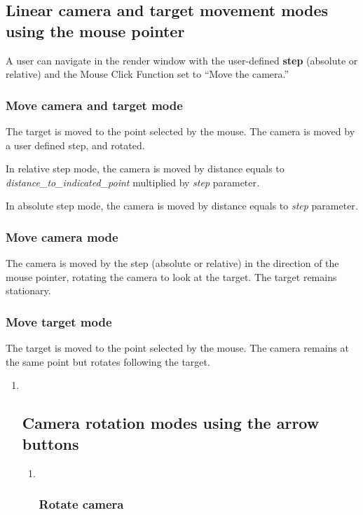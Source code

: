 \subsection{Linear camera and target movement modes using the mouse
pointer}\label{linear-camera-and-target-movement-modes-using-the-mouse-pointer}

A user can navigate in the render window with the user-defined
\textbf{step} (absolute or relative) and the Mouse Click Function set to
``Move the camera.''

\subsubsection{Move camera and target
mode}\label{move-camera-and-target-mode-1}

The target is moved to the point selected by the mouse. The camera is
moved by a user defined step, and rotated.

In relative step mode, the camera is moved by distance equals to
\emph{distance\_to\_indicated\_point} multiplied by \emph{step}
parameter\emph{.}

In absolute step mode, the camera is moved by distance equals to
\emph{step} parameter\emph{.}

\subsubsection{Move camera mode}\label{move-camera-mode-1}

The camera is moved by the step (absolute or relative) in the direction
of the mouse pointer, rotating the camera to look at the target. The
target remains stationary.

\subsubsection{Move target mode}\label{move-target-mode-1}

The target is moved to the point selected by the mouse. The camera
remains at the same point but rotates following the target.

\begin{enumerate}
\def\labelenumi{\arabic{enumi}.}
\item ~
  \subsection{Camera rotation modes using the arrow
  buttons}\label{camera-rotation-modes-using-the-arrow-buttons}

  \begin{enumerate}
  \def\labelenumii{\alph{enumii}.}
  \item ~
    \subsubsection{Rotate camera}\label{rotate-camera}
  \end{enumerate}
\end{enumerate}


